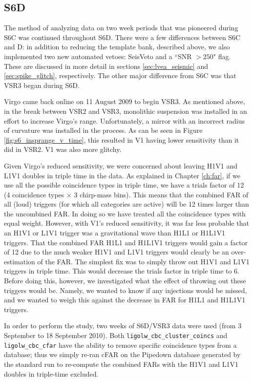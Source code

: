\subsection{S6D}
\label{sec:s6d}

The method of analyzing data on two week periods that was pioneered during S6C was continued throughout S6D. There were a few differences between S6C and D: in addition to reducing the template bank, described above, we also implemented two new automated vetoes: SeisVeto and a ``SNR $> 250$" flag. These are discussed in more detail in sections \ref{sec:lvea_seismic} and \ref{sec:spike_glitch}, respectively. The other major difference from S6C was that VSR3 began during S6D.

Virgo came back online on 11 August 2009 to begin VSR3. As mentioned above, in the break between VSR2 and VSR3, monolithic suspension was installed in an effort to increase Virgo's range. Unfortunately, a mirror with an incorrect radius of curvature was installed in the process. As can be seen in Figure \ref{fig:s6_insprange_v_time}, this resulted in V1 having lower sensitivity than it did in VSR2. V1 was also more glitchy.

Given Virgo's reduced sensitivity, we were concerned about leaving H1V1 and L1V1 doubles in triple time in the data. As explained in Chapter \ref{ch:far}, if we use all the possible coincidence types in triple time, we have a trials factor of 12 (4 coincidence types $\times$ 3 chirp-mass bins). This means that the combined \ac{FAR} of all (loud) triggers (for which all categories are active) will be 12 times larger than the uncombined \ac{FAR}. In doing so we have treated all the coincidence types with equal weight. However, with V1's reduced sensitivity, it was far less probable that an H1V1 or L1V1 trigger was a gravitational wave than H1L1 or H1L1V1 triggers. That the combined \ac{FAR} H1L1 and H1L1V1 triggers would gain a factor of 12 due to the much weaker H1V1 and L1V1 triggers would clearly be an over-estimation of the \ac{FAR}. The simplest fix was to simply throw out H1V1 and L1V1 triggers in triple time. This would decrease the trials factor in triple time to 6. Before doing this, however, we investigated what the effect of throwing out these triggers would be. Namely, we wanted to know if any injections would be missed, and we wanted to weigh this against the decrease in \ac{FAR} for H1L1 and H1L1V1 triggers.

In order to perform the study, two weeks of S6D/VSR3 data were used (from 3 September to 18 September 2010). Both \verb|ligolw_cbc_cluster_coincs| and \verb|ligolw_cbc_cfar| have the ability to remove specific coincidence types from a database; thus we simply re-ran cFAR on the Pipedown database generated by the standard run to re-compute the combined \acp{FAR} with the H1V1 and L1V1 doubles in triple-time excluded. 

